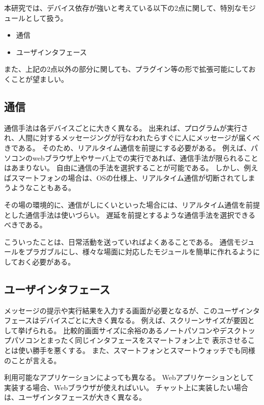 本研究では、デバイス依存が強いと考えている以下の2点に関して、特別なモジュールとして扱う。

\begin{itemize}
\itemsep1pt\parskip0pt
\item
  通信
\item
  ユーザインタフェース
\end{itemize}

また、上記の2点以外の部分に関しても、プラグイン等の形で拡張可能にしておくことが望ましい。

\subsection{通信}\label{ux901aux4fe1}

通信手法は各デバイスごとに大きく異なる。
出来れば、プログラムが実行され、人間に対するメッセージングが行なわれたらすぐに人にメッセージが届くべきである。
そのため、リアルタイム通信を前提にする必要がある。
例えば、パソコンのwebブラウザ上やサーバ上での実行であれば、通信手法が限られることはあまりない。
自由に通信の手法を選択することが可能である。
しかし、例えばスマートフォンの場合は、OSの仕様上、リアルタイム通信が切断されてしまうようなこともある。

その場の環境的に、通信がしにくいといった場合には、リアルタイム通信を前提とした通信手法は使いづらい。
遅延を前提とするような通信手法を選択できるべきである。

こういったことは、日常活動を送っていればよくあることである。
通信モジュールをプラガブルにし、様々な場面に対応したモジュールを簡単に作れるようにしておく必要がある。

\subsection{ユーザインタフェース}\label{ux30e6ux30fcux30b6ux30a4ux30f3ux30bfux30d5ux30a7ux30fcux30b9}

メッセージの提示や実行結果を入力する画面が必要となるが、このユーザインタフェースはデバイスごとに大きく異なる。
例えば、スクリーンサイズが要因として挙げられる。
比較的画面サイズに余裕のあるノートパソコンやデスクトップパソコンとまったく同じインタフェースをスマートフォン上で
表示させることは使い勝手を悪くする。
また、スマートフォンとスマートウォッチでも同様のことが言える。

利用可能なアプリケーションによっても異なる。
Webアプリケーションとして実装する場合、Webブラウザが使えればいい。
チャット上に実装したい場合は、ユーザインタフェースが大きく異なる。

